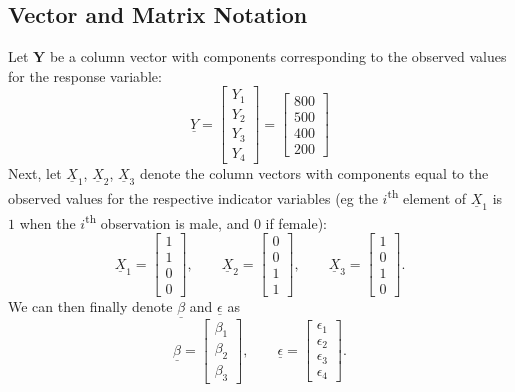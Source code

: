 \documentclass{article}
\begin{document}
\subsection{Vector and Matrix Notation}
Let $\mathbf{Y}$ be a column vector with components corresponding to the observed values for the response variable:
\begin{equation}
    \underline{Y} = \begin{bmatrix} Y_1 \\ Y_2 \\ Y_3 \\ Y_4 \end{bmatrix} = \begin{bmatrix} 800 \\ 500 \\ 400 \\ 200 \end{bmatrix}
\end{equation}
Next, let $\underline{X}_1$, $\underline{X}_2$, $\underline{X}_3$ denote the column vectors with components equal to the observed values for the respective indicator variables (eg the $i$\textsuperscript{th} element of $\underline{X}_1$ is $1$ when the $i$\textsuperscript{th} observation is male, and $0$ if female):
\begin{equation}
    \underline{X}_1 = \begin{bmatrix} 1 \\ 1 \\ 0 \\ 0 \end{bmatrix},\qquad \underline{X}_2 = \begin{bmatrix} 0 \\ 0 \\ 1 \\ 1 \end{bmatrix},\qquad \underline{X}_3 = \begin{bmatrix} 1 \\ 0 \\ 1 \\ 0 \end{bmatrix}.
\end{equation}
We can then finally denote $\underline{\beta}$ and $\underline{\epsilon}$ as
\begin{equation}
    \underline{\beta}=\begin{bmatrix} \beta_1 \\ \beta_2 \\ \beta_3 \end{bmatrix},\qquad \underline{\epsilon}=\begin{bmatrix} \epsilon_1 \\ \epsilon_2 \\ \epsilon_3 \\ \epsilon_4 \end{bmatrix}.
\end{equation}
\end{document}
